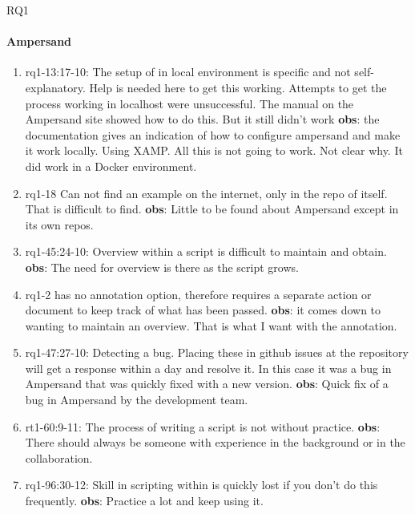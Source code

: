 \def\rq{RQ1}

\acrlong{\rq}

\paragraph{Ampersand}
\begin{enumerate}
    \item rq1-13:17-10: The setup of  in local environment is specific and not self-explanatory.
    Help is needed here to get this working.
    Attempts to get the process working in localhost were unsuccessful.
    The manual on the Ampersand site showed how to do this.
    But it still didn't work
    \newline\textbf{obs}: the documentation gives an indication of how to configure ampersand and make it work locally.
    Using XAMP.
    All this is not going to work.
    Not clear why.
    It did work in a Docker environment.

    \item rq1-18 Can not find an example on the internet, only in the repo of  itself.
    That is difficult to find.
    \newline\textbf{obs}: Little to be found about Ampersand except in its own repos.

    \item rq1-45:24-10: Overview within a script is difficult to maintain and obtain.
    \newline\textbf{obs}: The need for overview is there as the script grows.

    \item rq1-2  has no annotation option, therefore requires a separate action or document to keep track of what has been passed.
    \newline\textbf{obs}: it comes down to wanting to maintain an overview. 
    That is what I want with the annotation.

    \item rq1-47:27-10: Detecting a bug.
    Placing these in github issues at the  repository will get a response within a day and resolve it.
    In this case it was a bug in Ampersand that was quickly fixed with a new version.
    \newline\textbf{obs}: Quick fix of a bug in Ampersand by the development team.

    \item rt1-60:9-11: The process of writing a  script is not without practice.
    \newline\textbf{obs}: There should always be someone with experience in the background or in the collaboration.

    \item rq1-96:30-12: Skill in scripting within  is quickly lost if you don't do this frequently.
    \newline\textbf{obs}: Practice a lot and keep using it.

\end{enumerate}

